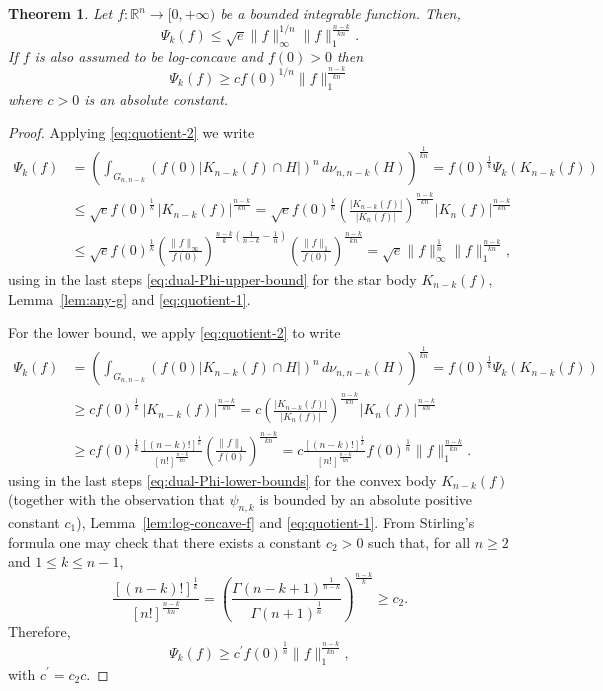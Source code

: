 \documentclass[11pt,leqno]{article}
\newtheorem{theorem}{Theorem}[section]
\theoremstyle{definition}
\theoremstyle{remark}
\numberwithin{equation}{section}
\newcommand{\ls}{\leqslant}
\newcommand{\gr}{\geqslant}
\newcommand{\1}{\textbf{1}}
\begin{document}
\begin{theorem}\label{th:dual-functional}Let $f:{\mathbb R}^n\to [0,+\infty)$ be a bounded integrable function. Then,
$$\Psi_k(f)\ls \sqrt{e}\|f\|_{\infty}^{1/n}\|f\|_1^{\frac{n-k}{kn}}.$$
If $f$ is also assumed to be log-concave and $f(0)>0$ then
$$\Psi_k(f)\gr cf(0)^{1/n}\|f\|_1^{\frac{n-k}{kn}}$$
where $c>0$ is an absolute constant.
\end{theorem}

\begin{proof}Applying \eqref{eq:quotient-2} we write
\begin{align*}
\Psi_k(f) &=\left(\int_{G_{n,n-k}} (f(0)|K_{n-k}(f)\cap H|)^n \,d\nu_{n,n-k}(H) \right)^{\frac{1}{kn}}= f(0)^{\frac{1}{k}}\Psi_k(K_{n-k}(f))\\
&\ls \sqrt{e}f(0)^{\frac{1}{k}}\,|K_{n-k}(f)|^{\frac{n-k}{kn}}
=\sqrt{e}f(0)^{\frac{1}{k}}\left(\frac{|K_{n-k}(f)|}{|K_n(f)|}\right)^{\frac{n-k}{kn}}|K_n(f)|^{\frac{n-k}{kn}}\\
&\ls \sqrt{e}f(0)^{\frac{1}{k}}\left(\frac{\|f\|_{\infty}}{f(0)}\right)^{\frac{n-k}{k}\left(\frac{1}{n-k}-\frac{1}{n}\right)}
\left(\frac{\|f\|_1}{f(0)}\right)^{\frac{n-k}{kn}}=\sqrt{e}\|f\|_{\infty}^{\frac{1}{n}}\|f\|_1^{\frac{n-k}{kn}},
\end{align*}
using in the last steps \eqref{eq:dual-Phi-upper-bound} for the star body $K_{n-k}(f)$, Lemma~\ref{lem:any-g} and
\eqref{eq:quotient-1}.

For the lower bound, we apply \eqref{eq:quotient-2} to write
\begin{align*}
\Psi_k(f) &=\left(\int_{G_{n,n-k}} (f(0)|K_{n-k}(f)\cap H|)^n \,d\nu_{n,n-k}(H) \right)^{\frac{1}{kn}}= f(0)^{\frac{1}{k}}\Psi_k(K_{n-k}(f))\\
&\gr cf(0)^{\frac{1}{k}}\,|K_{n-k}(f)|^{\frac{n-k}{kn}}
=c\left(\frac{|K_{n-k}(f)|}{|K_n(f)|}\right)^{\frac{n-k}{kn}}|K_n(f)|^{\frac{n-k}{kn}}\\
&\gr cf(0)^{\frac{1}{k}}\frac{[(n-k)!]^{\frac{1}{k}}}{[n!]^{\frac{n-k}{kn}}}
\left(\frac{\|f\|_1}{f(0)}\right)^{\frac{n-k}{kn}}=c\frac{[(n-k)!]^{\frac{1}{k}}}{[n!]^{\frac{n-k}{kn}}}
f(0)^{\frac{1}{n}}\|f\|_1^{\frac{n-k}{kn}}.
\end{align*}
using in the last steps \eqref{eq:dual-Phi-lower-bounds} for the convex body $K_{n-k}(f)$
(together with the observation that $\psi_{n,k}$ is bounded by an absolute positive constant $c_1$), Lemma~\ref{lem:log-concave-f}
and \eqref{eq:quotient-1}. From Stirling's formula one may check that there exists a constant $c_2>0$ such that, for all $n\gr 2$ and $1\ls k\ls n-1$,
\begin{equation}\label{eq:constant}\frac{[(n-k)!]^{\frac{1}{k}}}{[n!]^{\frac{n-k}{kn}}}
=\left(\frac{\Gamma(n-k+1)^{\frac{1}{n-k}}}{\Gamma(n+1)^{\frac{1}{n}}}\right)^{\frac{n-k}{k}}\gr c_2.
\end{equation}
Therefore,
$$\Psi_k(f)\gr c^{\prime}f(0)^{\frac{1}{n}}\|f\|_1^{\frac{n-k}{kn}},$$
with $c^{\prime}=c_2c$.
\end{proof}
\end{document}
